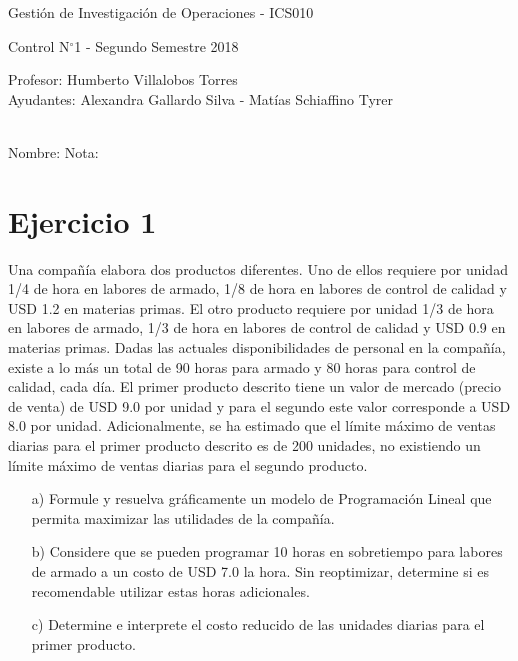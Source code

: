 \documentclass[letterpaper,11pt,oneside]{article}
\newcommand{\grad}{$^{\circ}$}
\begin{document}
	\begin{center}
		{\Large Gestión de Investigación de Operaciones - ICS010}
		\par {\large Control N\grad 1 - Segundo Semestre 2018}
	\end{center}

	\begin{center}
		Profesor: Humberto Villalobos Torres\\
		Ayudantes: Alexandra Gallardo Silva - Matías Schiaffino Tyrer
	\end{center}
	\ \ \\
	Nombre: \underline{\hspace{10.4cm}}\hspace{1cm} Nota: \underline{\hspace{2.1cm}}
	
\section*{Ejercicio 1}

Una compañía elabora dos productos diferentes. Uno de ellos requiere por unidad 1/4 de hora en labores de armado, 1/8 de hora en labores de control de calidad y USD 1.2 en materias primas. El otro producto requiere por unidad 1/3 de hora en labores de armado, 1/3 de hora en labores de control de calidad y USD 0.9 en materias primas. Dadas las actuales disponibilidades de personal en la compañía, existe a lo más un total de 90 horas para armado y 80 horas para control de calidad, cada día. El primer producto descrito tiene un valor de mercado (precio de venta) de USD 9.0 por unidad y para el segundo este valor corresponde a USD 8.0 por unidad. Adicionalmente, se ha estimado que el límite máximo de ventas diarias para el primer producto descrito es de 200 unidades, no existiendo un límite máximo de ventas diarias para el segundo producto.

\begin{itemize}
	\item[a)] Formule y resuelva gráficamente un modelo de Programación Lineal que permita maximizar las utilidades de la compañía.
	\item[b)] Considere que se pueden programar 10 horas en sobretiempo para labores de armado a un costo de USD 7.0 la hora. Sin reoptimizar, determine si es recomendable utilizar estas horas adicionales.
	\item[c)] Determine e interprete el costo reducido de las unidades diarias para el primer producto.
\end{itemize}
\end{document}
